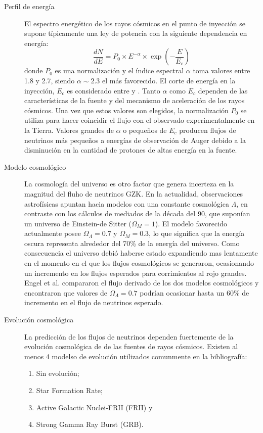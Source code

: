 \begin{description}
	\item[Perfil de energ\'ia] El espectro energ\'etico de los rayos c\'osmicos en el punto de inyecci\'on se supone t\'ipicamente una ley de potencia con la siguiente dependencia en energ\'ia:
	\begin{equation}
		\frac{dN}{dE}=P_{0} \times E^{-\alpha} \times \exp{(-\frac{E}{E_{c}})}
	\end{equation}
	donde $P_0$ es una normalizaci\'on y el \'indice espectral $\alpha$ toma valores entre 1.8 y 2.7, siendo $\alpha\sim2.3$ el m\'as favorecido.
	El corte de energ\'ia en la inyecci\'on, $E_c$ es considerado entre  y .
	Tanto $\alpha$ como $E_c$ dependen de las caracter\'isticas de la fuente y del mecanismo de aceleraci\'on de los rayos c\'osmicos.
	Una vez que estos valores son elegidos, la normalizaci\'on $P_0$ se utiliza para hacer coincidir el flujo con el observado experimentalmente en la Tierra.
	Valores grandes de $\alpha$ o peque\~nos de $E_c$ producen flujos de neutrinos m\'as peque\~nos a energ\'ias de observaci\'on de Auger debido a la disminuci\'on en la cantidad de protones de altas energ\'ia en la fuente.
	
	\item[Modelo cosmol\'ogico]
	La cosmolog\'ia del universo es otro factor que genera incerteza en la magnitud del fluho de neutrinos GZK. 
	En la actualidad, observaciones astrof\'isicas apuntan hacia modelos con una constante cosmol\'ogica $\Lambda$\cite{cite:Lambda}, en contraste con los c\'alculos de mediados de la d\'ecada del 90, que supon\'ian un universo de Einstein-de Sitter ($\Omega_{M}=1$). 
	El modelo favorecido actualmente posee $\Omega_{\Lambda}=0.7$ y $\Omega_{M}=0.3$\cite{cite:LambdaM}, lo que significa que la energ\'ia oscura representa alrededor del 70\% de la energ\'ia del universo.
	Como consecuencia el universo debi\'o haberse estado expandiendo mas lentamente en el momento en el que los flujos cosmol\'ogicos se generaron, ocasionando un incremento en los flujos esperados para corrimientos al rojo grandes.
	Engel et al. \cite{cite:nuEngel} compararon el flujo derivado de los dos modelos cosmol\'ogicos y encontraron que valores de $\Omega_{\Lambda}=0.7$ podr\'ian ocasionar hasta un 60\% de incremento en el flujo de neutrinos esperado.
	
	\item[Evoluci\'on cosmol\'ogica]
	La predicci\'on de los flujos de neutrinos dependen fuertemente de la evoluci\'on cosmol\'ogica de de las fuentes de rayos c\'osmicos.
	Existen al menos 4 modelso de evoluci\'on utilizados comunmente en la bibliograf\'ia:
	\begin{enumerate}
	 \item Sin evoluci\'on;
	 \item Star Formation Rate;
	 \item Active Galactic Nuclei-FRII (FRII) y
	 \item Strong Gamma Ray Burst (GRB).
	\end{enumerate}
	

\end{description}
